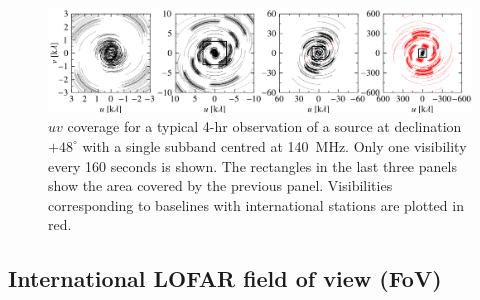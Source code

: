 \documentclass[graybox]{svmult}
\begin{document}
\begin{figure}[t]
\begin{center}
\includegraphics[width=\textwidth]{figures/uv_cov.png}
\caption{$uv$ coverage for a typical 4-hr observation of a source at declination
$+48^{\circ}$ with a single subband centred at 140~MHz. Only one visibility every 160 seconds is shown. The rectangles in the last three panels show the area covered by the previous panel. Visibilities corresponding to baselines with international
stations are plotted in red.}
\label{fig:uvcoverage}
\end{center}
\end{figure}

%


\subsection{International LOFAR field of view (FoV)}\label{sec:fov}
\end{document}
